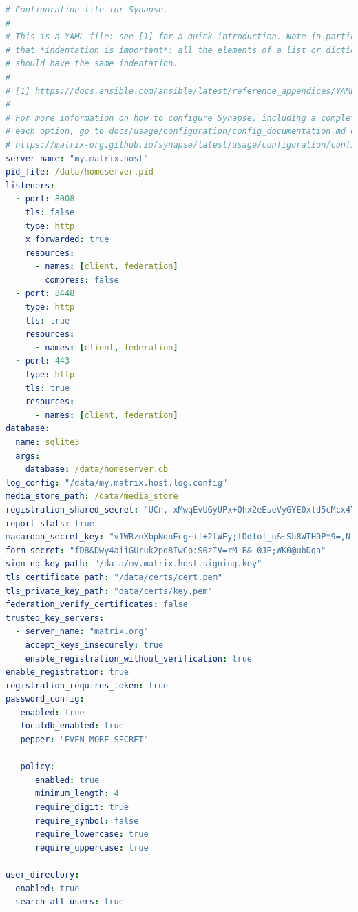     \newpage
    \begin{lstlisting}[language=yaml,firstnumber=1]
# Configuration file for Synapse.
#
# This is a YAML file: see [1] for a quick introduction. Note in particular
# that *indentation is important*: all the elements of a list or dictionary
# should have the same indentation.
#
# [1] https://docs.ansible.com/ansible/latest/reference_appendices/YAMLSyntax.html
#
# For more information on how to configure Synapse, including a complete accounting of
# each option, go to docs/usage/configuration/config_documentation.md or
# https://matrix-org.github.io/synapse/latest/usage/configuration/config_documentation.html
server_name: "my.matrix.host"
pid_file: /data/homeserver.pid
listeners:
  - port: 8008
    tls: false
    type: http
    x_forwarded: true
    resources:
      - names: [client, federation]
        compress: false
  - port: 8448
    type: http
    tls: true
    resources:
      - names: [client, federation]
  - port: 443
    type: http
    tls: true
    resources:
      - names: [client, federation]
database:
  name: sqlite3
  args:
    database: /data/homeserver.db
log_config: "/data/my.matrix.host.log.config"
media_store_path: /data/media_store
registration_shared_secret: "UCn,-xMwqEvUGyUPx+Qhx2eEseVyGYE0xld5cMcx4Y*S,yzrA~"
report_stats: true
macaroon_secret_key: "v1WRznXbpNdnEcg~if+2tWEy;fDdfof_n&~Sh8WTH9P*9=,N;~"
form_secret: "fD8&Dwy4aiiGUruk2pd8IwCp:S0zIV=rM_B&_0JP;WK0@ubDqa"
signing_key_path: "/data/my.matrix.host.signing.key"
tls_certificate_path: "/data/certs/cert.pem"
tls_private_key_path: "data/certs/key.pem"
federation_verify_certificates: false
trusted_key_servers:
  - server_name: "matrix.org"
    accept_keys_insecurely: true
    enable_registration_without_verification: true
enable_registration: true
registration_requires_token: true
password_config:
   enabled: true
   localdb_enabled: true
   pepper: "EVEN_MORE_SECRET"

   policy:
      enabled: true
      minimum_length: 4
      require_digit: true
      require_symbol: false
      require_lowercase: true
      require_uppercase: true

user_directory:
  enabled: true
  search_all_users: true
    \end{lstlisting}




%
%